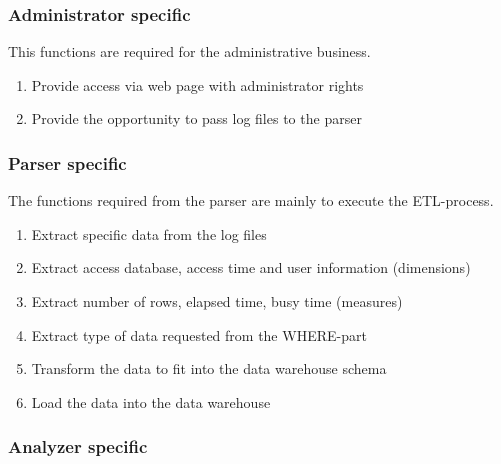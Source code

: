 \subsubsection*{Administrator specific}
This functions are required for the administrative business.

\begin{enumerate}[resume*=func]
  
  \item Provide access via web page with administrator rights\label{f15}
   
  \item Provide the opportunity to pass \glspl{log file} to the \gls{parser} \label{f16}
   
\end{enumerate}


\subsubsection*{Parser specific}
 The functions required from the \gls{parser} are mainly to execute the \gls{ETL-process}. 
 
\begin{enumerate}[resume*=func]
  
  \item Extract specific data from the \glspl{log file} \label{p1}
  
  \item Extract access \gls{database}, access time and user information (\glspl{dimension})\label{p2} %
  
  \item Extract number of \glspl{row}, \gls{elapsed time}, \gls{busy time} (\glspl{measure})\label{f17} %
  
  \item Extract type of data requested from the \gls{WHERE-part}\label{p4} %
  
  \item Transform the data to fit into the \gls{data warehouse} schema\label{f18}
  
  \item Load the data into the \gls{data warehouse} \label{f19}

\end{enumerate}

\subsubsection*{Analyzer specific}
 
